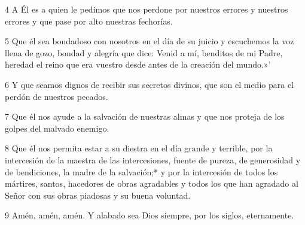 \par 4 A Él es a quien le pedimos que nos perdone por nuestros errores y nuestros errores y que pase por alto nuestras fechorías.

\par 5 Que él sea bondadoso con nosotros en el día de su juicio y escuchemos la voz llena de gozo, bondad y alegría que dice: Venid a mí, benditos de mi Padre, heredad el reino que era vuestro desde antes de la creación del mundo.»'

\par 6 Y que seamos dignos de recibir sus secretos divinos, que son el medio para el perdón de nuestros pecados.

\par 7 Que él nos ayude a la salvación de nuestras almas y que nos proteja de los golpes del malvado enemigo.

\par 8 Que él nos permita estar a su diestra en el día grande y terrible, por la intercesión de la maestra de las intercesiones, fuente de pureza, de generosidad y de bendiciones, la madre de la salvación;* y por la intercesión de todos los mártires, santos, hacedores de obras agradables y todos los que han agradado al Señor con sus obras piadosas y su buena voluntad.

\par 9 Amén, amén, amén. Y alabado sea Dios siempre, por los siglos, eternamente.

